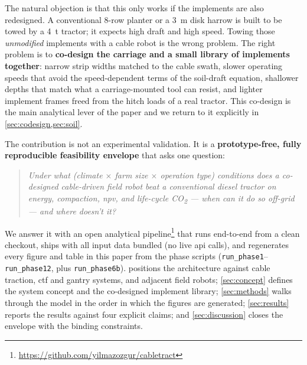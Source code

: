 \documentclass[11pt,a4paper]{article}
\newcommand{\cabletractrepo}{\url{https://github.com/yilmazozgur/cabletract}}
\begin{document}
The natural objection is that this only works if the implements are also redesigned. A conventional 8-row planter or a \SI{3}{\meter} disk harrow is built to be towed by a \SI{4}{\tonne} tractor; it expects high draft and high speed. Towing those \emph{unmodified} implements with a cable robot is the wrong problem. The right problem is to \textbf{co-design the carriage and a small library of implements together}: narrow strip widths matched to the cable swath, slower operating speeds that avoid the speed-dependent terms of the soil-draft equation, shallower depths that match what a carriage-mounted tool can resist, and lighter implement frames freed from the hitch loads of a real tractor. This co-design is the main analytical lever of the paper and we return to it explicitly in \cref{sec:codesign,sec:soil}.

The contribution is not an experimental validation. It is a \textbf{prototype-free, fully reproducible feasibility envelope} that asks one question:

\begin{quote}
\itshape Under what (climate $\times$ farm size $\times$ operation type) conditions does a co-designed cable-driven field robot beat a conventional diesel tractor on energy, compaction, \gls{npv}, and life-cycle CO\textsubscript{2} --- when can it do so off-grid --- and where doesn't it?
\end{quote}

We answer it with an open analytical pipeline\footnote{\cabletractrepo} that runs end-to-end from a clean checkout, ships with all input data bundled (no live \gls{api} calls), and regenerates every figure and table in this paper from the phase scripts (\texttt{run\_phase1}--\texttt{run\_phase12}, plus \texttt{run\_phase6b}).  positions the architecture against cable traction, \gls{ctf} and gantry systems, and adjacent field robots; \cref{sec:concept} defines the system concept and the co-designed implement library; \cref{sec:methods} walks through the model in the order in which the figures are generated; \cref{sec:results} reports the results against four explicit claims; and \cref{sec:discussion} closes the envelope with the binding constraints.
\end{document}
